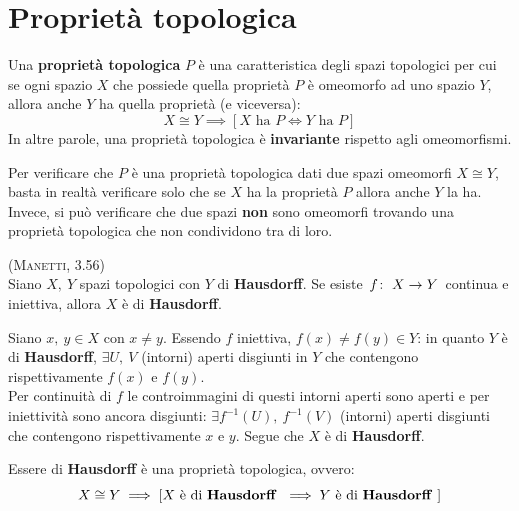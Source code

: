 \section{Proprietà topologica}
\begin{define}
Una \textbf{proprietà topologica} $P$ è una caratteristica degli spazi topologici per cui se ogni spazio $X$ che possiede quella proprietà $P$ è omeomorfo ad uno spazio $Y$, allora anche $Y$ ha quella proprietà (e viceversa):
\begin{equation}
X\cong Y\implies \left[ X\text{ ha }P\iff Y\text{ ha }P\right]
\end{equation}
In altre parole, una proprietà topologica è \textbf{invariante} rispetto agli omeomorfismi.
\end{define}
\begin{observe}
Per verificare che $P$ è una proprietà topologica dati due spazi omeomorfi $X\cong Y$, basta in realtà verificare solo che se $X$ ha la proprietà $P$ allora anche $Y$ la ha.\\
Invece, si può verificare che due spazi \textbf{non} sono omeomorfi trovando una proprietà topologica che non condividono tra di loro.
\end{observe}
\begin{exercise}\label{hausexercise}\textsc{(Manetti, 3.56)}\\
Siano $X,\ Y$ spazi topologici con $Y$ di \textbf{Hausdorff}. Se esiste $\funz{f}{X}{Y}$ continua e iniettiva, allora $X$ è di \textbf{Hausdorff}.
\end{exercise}
\begin{demonstration}
Siano $x,\ y\in X$ con $x\neq y$. Essendo $f$ iniettiva, $f\left(x\right)\neq f\left(y\right)\in Y$: in quanto $Y$ è di \textbf{Hausdorff}, $\exists U,\ V$ (intorni) aperti disgiunti in $Y$ che contengono rispettivamente $f\left(x\right)$ e $f\left(y\right)$.\\
Per continuità di $f$ le controimmagini di questi intorni aperti sono aperti e per iniettività sono ancora disgiunti: $\exists f^{-1}\left(U\right),\ f^{-1}\left(V\right)$ (intorni) aperti disgiunti che contengono rispettivamente $x$ e $y$. Segue che $X$ è di \textbf{Hausdorff}.
\end{demonstration}
\begin{proposition}
Essere di \textbf{Hausdorff} è una proprietà topologica, ovvero:
\begin{equation}
	X\cong Y\implies \left[ X\text{ è di \textbf{Hausdorff} }\implies Y\text{ è di \textbf{Hausdorff} }\right]
\end{equation}
\vspace{-8mm}
\end{proposition}
